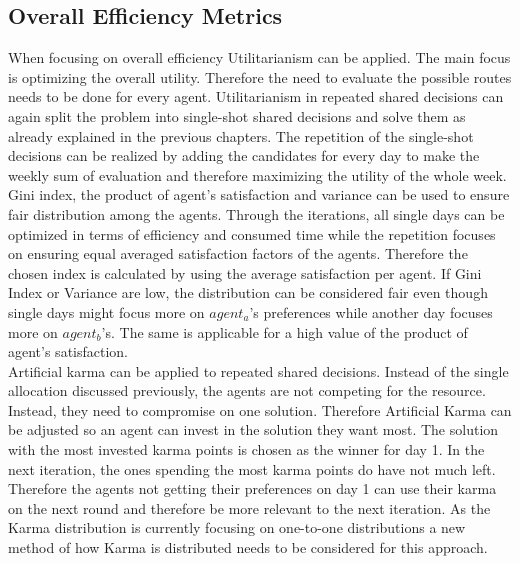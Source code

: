 \documentclass[german, a4paper, 11pt, oneside]{scrbook}
\begin{document}
\subsection{Overall Efficiency Metrics}
When focusing on overall efficiency Utilitarianism can be applied. The main focus is optimizing the overall utility. Therefore the need to evaluate the possible routes needs to be done for every agent. Utilitarianism in repeated shared decisions can again split the problem into single-shot shared decisions and solve them as already explained in the previous chapters. The repetition of the single-shot decisions can be realized by adding the candidates for every day to make the weekly sum of evaluation and therefore maximizing the utility of the whole week. \\Gini index, the product of agent's satisfaction and variance can be used to ensure fair distribution among the agents. Through the iterations, all single days can be optimized in terms of efficiency and consumed time while the repetition focuses on ensuring equal averaged satisfaction factors of the agents. Therefore the chosen index is calculated by using the average satisfaction per agent. If Gini Index or Variance are low, the distribution can be considered fair even though single days might focus more on $agent_a$'s preferences while another day focuses more on $agent_ b$'s. The same is applicable for a high value of the product of agent's satisfaction.
\\Artificial karma can be applied to repeated shared decisions. Instead of the single allocation discussed previously, the agents are not competing for the resource. Instead, they need to compromise on one solution. Therefore Artificial Karma can be adjusted so an agent can invest in the solution they want most. The solution with the most invested karma points is chosen as the winner for day 1. In the next iteration, the ones spending the most karma points do have not much left. Therefore the agents not getting their preferences on day 1 can use their karma on the next round and therefore be more relevant to the next iteration. As the Karma distribution is currently focusing on one-to-one distributions a new method of how Karma is distributed needs to be considered for this approach.
\end{document}

